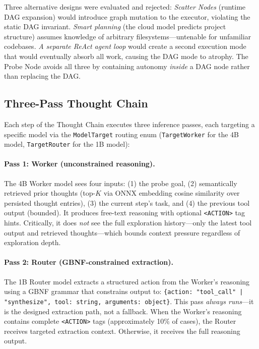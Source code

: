 \documentclass{article}
\begin{document}
Three alternative designs were evaluated and rejected:
\emph{Scatter Nodes} (runtime DAG expansion) would introduce graph mutation to the executor, violating the static DAG invariant.
\emph{Smart planning} (the cloud model predicts project structure) assumes knowledge of arbitrary filesystems---untenable for unfamiliar codebases.
\emph{A separate ReAct agent loop} would create a second execution mode that would eventually absorb all work, causing the DAG mode to atrophy.
The Probe Node avoids all three by containing autonomy \emph{inside} a DAG node rather than replacing the DAG.

\subsection{Three-Pass Thought Chain}
\label{sec:thought_chain}

Each step of the Thought Chain executes three inference passes, each targeting a specific model via the \texttt{ModelTarget} routing enum (\texttt{TargetWorker} for the 4B model, \texttt{TargetRouter} for the 1B model):

\paragraph{Pass 1: Worker (unconstrained reasoning).}
The 4B Worker model sees four inputs: (1) the probe goal, (2) semantically retrieved prior thoughts (top-$K$ via ONNX embedding cosine similarity over persisted thought entries), (3) the current step's task, and (4) the previous tool output (bounded).
It produces free-text reasoning with optional \texttt{<ACTION>} tag hints.
Critically, it does \emph{not} see the full exploration history---only the latest tool output and retrieved thoughts---which bounds context pressure regardless of exploration depth.

\paragraph{Pass 2: Router (GBNF-constrained extraction).}
The 1B Router model extracts a structured action from the Worker's reasoning using a GBNF grammar that constrains output to: \texttt{\{action: "tool\_call" | "synthesize", tool: string, arguments: object\}}.
This pass \emph{always runs}---it is the designed extraction path, not a fallback.
When the Worker's reasoning contains complete \texttt{<ACTION>} tags (approximately 10\% of cases), the Router receives targeted extraction context.
Otherwise, it receives the full reasoning output.
\end{document}
